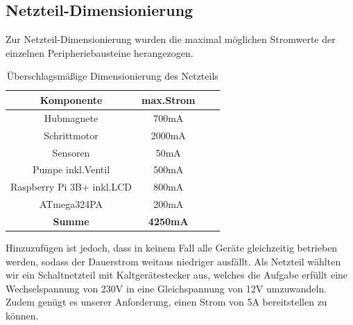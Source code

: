 \newpage

\subsection{Netzteil-Dimensionierung}

Zur Netzteil-Dimensionierung wurden die maximal möglichen Stromwerte der einzelnen Peripheriebausteine herangezogen.

\begin{table}[h]
    \centering
    \begin{tabular}{|c|c|c|c|}
        \hline
        \textbf{Komponente} & \textbf{max.Strom} \\ \hline
        Hubmagnete & 700mA \\ \hline
        Schrittmotor & 2000mA \\ \hline
        Sensoren & 50mA \\ \hline
        Pumpe inkl.Ventil & 500mA \\ \hline
        Raspberry Pi 3B+ inkl.\acs{LCD} & 800mA \\ \hline
        ATmega324PA & 200mA \\ \hline
        \textbf{Summe} & \textbf{4250mA} \\ \hline
    \end{tabular}
    \caption{Überschlagsmäßige Dimensionierung des Netzteils}
\end{table}

Hinzuzufügen ist jedoch, dass in keinem Fall alle Geräte gleichzeitig betrieben werden, sodass der Dauerstrom weitaus niedriger ausfällt.
Als Netzteil wählten wir ein Schaltnetzteil mit Kaltgerätestecker aus, welches die Aufgabe erfüllt eine Wechselspannung von 230V in eine Gleichspannung von 12V umzuwandeln.
Zudem genügt es unserer Anforderung, einen Strom von 5A bereitstellen zu können.

